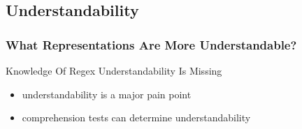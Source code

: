\subsection{Understandability}

{
\begin{frame}
\frametitle{What Representations Are More Understandable?}
\begin{block}{\begin{large}Knowledge Of Regex Understandability Is Missing\end{large}}
\begin{itemize}
\item \begin{large}understandability is a major pain point\end{large}
\item \begin{large}comprehension tests can determine understandability\end{large}
\end{itemize}
\end{block}
\end{frame}
}

